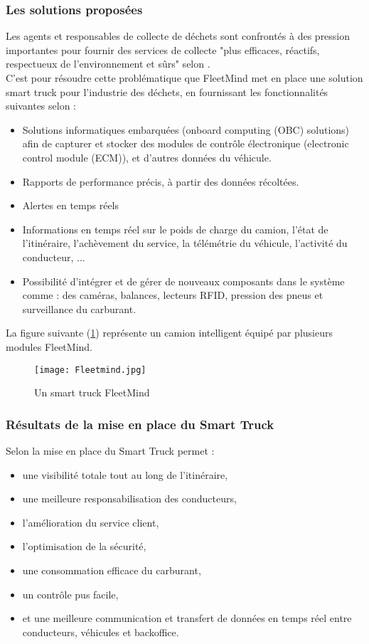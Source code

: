 \documentclass[a4paper,12pt]{report}
\begin{document}
\subsubsection*{Les solutions proposées}
Les agents et responsables de collecte de déchets sont confrontés à des pression importantes pour fournir des services de collecte "plus efficaces, réactifs, respectueux de l'environnement et sûrs" selon \cite{ref22}.\\
C'est pour résoudre cette problématique que FleetMind met en place une solution smart truck pour l'industrie des déchets, en fournissant les fonctionnalités suivantes selon \cite{ref22} :
\begin{itemize}
\item Solutions informatiques embarquées (onboard computing (OBC) solutions) afin de capturer et stocker des modules de contrôle électronique (electronic control module (ECM)), et d'autres données du véhicule.
\item Rapports de performance précis, à partir des données récoltées.
\item Alertes en temps réels
\item Informations en temps réel sur le poids de charge du camion, l'état de l'itinéraire, l'achèvement du service, la télémétrie du véhicule, l'activité du conducteur, ...
\item Possibilité d'intégrer et de gérer de nouveaux composants dans le système comme : des caméras, balances, lecteurs RFID, pression des pneus et surveillance du carburant.
\end{itemize}
La figure suivante (\ref{fleetmind}) représente un camion intelligent équipé par plusieurs modules FleetMind.
\begin {figure}[H]
\begin{center} \texttt{[image: Fleetmind.jpg]}
\caption{Un smart truck FleetMind \cite{ref23}}
\label{fleetmind}
\end{center}
\end{figure}



\subsubsection*{Résultats de la mise en place du Smart Truck}
Selon \cite{ref22} la mise en place du Smart Truck permet :
\begin{itemize}
\item une visibilité totale tout au long de l'itinéraire,
\item une meilleure responsabilisation des conducteurs,
\item l'amélioration du service client,
\item l'optimisation de la sécurité,
\item une consommation efficace du carburant,
\item un contrôle pus facile, 
\item et une meilleure communication et transfert de données en temps réel entre conducteurs, véhicules et backoffice.
\end{itemize}
\end{document}
